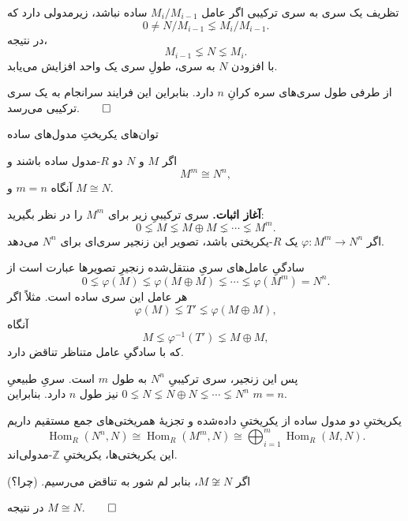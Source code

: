 \begin{frame}[t]{تظریف یک سری به سری ترکیبی}
  \label{lec13:refinement-proof}
  اگر عامل $M_i/M_{i-1}$ ساده نباشد، زیرمدولی دارد که
  \[
    0\neq N/M_{i-1}\lneq M_i/M_{i-1}.
  \]
  در نتیجه،
  \[
    M_{i-1}\lneq N\lneq M_i.
  \]
  با افزودن $N$ به سری، طولِ سری یک واحد افزایش می‌یابد.
  \par\medskip
  از طرفی طول سری‌های سره کرانِ $n$ دارد. بنابراین این فرایند سرانجام
  به یک سری ترکیبی می‌رسد.\hfill$\qed$
\end{frame}

\begin{frame}[t]{توان‌های یکریختِ مدول‌های ساده}
  \label{lec13:simple-powers}
  \begin{corollary}
    اگر $M$ و $N$ دو $R$-مدول ساده باشند و
    \[
      M^m\cong N^n,
    \]
    آنگاه $m=n$ و $M\cong N$.
  \end{corollary}
  \textbf{آغاز اثبات.} سری ترکیبیِ زیر برای $M^m$ را در نظر بگیرید:
  \[
    0\lneq M\lneq M\oplus M\lneq\cdots\lneq M^m.
  \]
  اگر $\varphi:M^m\longrightarrow N^n$ یک $R$-یکریختی باشد، تصویر این زنجیر
  سری‌ای برای $N^n$ می‌دهد.
\end{frame}

\begin{frame}[t]{سادگیِ عامل‌های سریِ منتقل‌شده}
  \label{lec13:transported-series}
  زنجیرِ تصویرها عبارت است از
  \[
    0\lneq\varphi(M)\lneq\varphi(M\oplus M)
      \lneq\cdots\lneq\varphi(M^m)=N^n.
  \]
  هر عامل این سری ساده است. مثلاً اگر
  \[
    \varphi(M)\lneq T'\lneq\varphi(M\oplus M),
  \]
  آنگاه
  \[
    M\lneq\varphi^{-1}(T')\lneq M\oplus M,
  \]
  که با سادگیِ عامل متناظر تناقض دارد.
  \par\medskip
  پس این زنجیر، سری ترکیبیِ $N^n$ به طول $m$ است. سریِ طبیعیِ
  $0\lneq N\lneq N\oplus N\lneq\cdots\lneq N^n$ نیز طول $n$ دارد.
  بنابراین $m=n$.
\end{frame}

\begin{frame}[t]{یکریختیِ دو مدول ساده}
  \label{lec13:simple-powers-hom}
  از یکریختیِ داده‌شده و تجزیهٔ همریختی‌های جمع مستقیم داریم
  \[
    \operatorname{Hom}_R(N^n,N)
      \cong\operatorname{Hom}_R(M^m,N)
      \cong\bigoplus_{i=1}^{m}\operatorname{Hom}_R(M,N).
  \]
  این یکریختی‌ها، یکریختیِ $\mathbb Z$-مدولی‌اند.
  \par\medskip
  اگر $M\not\cong N$، بنابر لم شور به تناقض می‌رسیم. \hfill(چرا؟)
  \par\medskip
  در نتیجه $M\cong N$.\hfill$\qed$
\end{frame}

